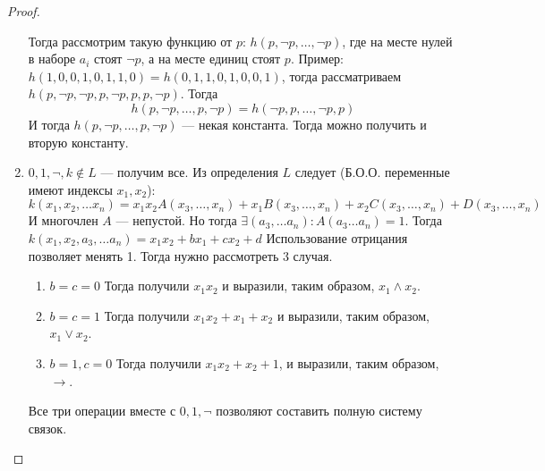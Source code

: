 \begin{proof}
\begin{enumerate}
        Тогда рассмотрим такую функцию от $p$:
        $h(p, \neg p, \dots, \neg p)$, где на месте нулей в наборе $a_i$ стоят $\neg p$, а на месте единиц стоят $p$. Пример:
        $h(1, 0, 0, 1, 0, 1, 1, 0) = h(0, 1, 1, 0, 1, 0, 0, 1)$, тогда рассматриваем $h(p, \neg p, \neg p, p, \neg p, p, p, \neg p)$. Тогда 
        $$h(p, \neg p, \dots, p, \neg p) = h(\neg p, p, \dots, \neg p, p)$$
        И тогда $h(p, \neg p, \dots, p, \neg p)$ --- некая константа. Тогда можно получить и вторую константу. 
        \item $0, 1, \neg, k \not\in L$ --- получим все. Из определения $L$ следует (Б.О.О. переменные имеют индексы $x_1, x_2$):
        $$k(x_1, x_2,\dots x_n) = x_1x_2A(x_3, \dots, x_n) + x_1B(x_3, \dots, x_n) + x_2C(x_3, \dots, x_n) + D(x_3, \dots, x_n)$$
        И многочлен $A$ --- непустой. Но тогда $\exists (a_3, \dots a_n): A(a_3 \dots a_n) = 1$. Тогда $k(x_1, x_2, a_3, \dots a_n) = x_1x_2 + bx_1 + cx_2 + d$
        Использование отрицания позволяет менять 1. Тогда нужно рассмотреть 3 случая.
        \begin{enumerate}
            \item $b=c=0$ Тогда получили $x_1x_2$ и выразили, таким образом, $x_1 \wedge x_2$.
            \item $b=c=1$ Тогда получили $x_1x_2 + x_1 + x_2$ и выразили, таким образом, $x_1 \vee x_2$.
            \item $b = 1, c = 0$ Тогда получили $x_1x_2 + x_2 + 1$, и выразили, таким образом, $\rightarrow$.
        \end{enumerate}
        Все три операции вместе с $0, 1, \neg$ позволяют составить полную систему связок.
    \end{enumerate}
\end{proof}